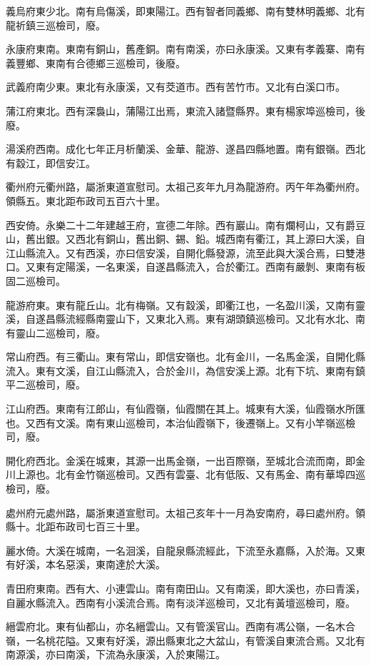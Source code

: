 義烏府東少北。南有烏傷溪，即東陽江。西有智者同義鄉、南有雙林明義鄉、北有龍祈鎮三巡檢司，廢。

永康府東南。東南有銅山，舊產銅。南有南溪，亦曰永康溪。又東有孝義寨、南有義豐鄉、東南有合德鄉三巡檢司，後廢。

武義府南少東。東北有永康溪，又有茭道市。西有苦竹市。又北有白溪口市。

蒲江府東北。西有深裊山，蒲陽江出焉，東流入諸暨縣界。東有楊家埠巡檢司，後廢。

湯溪府西南。成化七年正月析蘭溪、金華、龍游、遂昌四縣地置。南有銀嶺。西北有縠江，即信安江。

衢州府元衢州路，屬浙東道宣慰司。太祖己亥年九月為龍游府。丙午年為衢州府。領縣五。東北距布政司五百六十里。

西安倚。永樂二十二年建越王府，宣德二年除。西有巖山。南有爛柯山，又有爵豆山，舊出銀。又西北有銅山，舊出銅、錫、鉛。城西南有衢江，其上源曰大溪，自江山縣流入。又有西溪，亦曰信安溪，自開化縣發源，流至此與大溪合焉，曰雙港口。又東有定陽溪，一名東溪，自遂昌縣流入，合於衢江。西南有嚴剝、東南有板固二巡檢司。

龍游府東。東有龍丘山。北有梅嶺。又有縠溪，即衢江也，一名盈川溪，又南有靈溪，自遂昌縣流經縣南靈山下，又東北入焉。東有湖頭鎮巡檢司。又北有水北、南有靈山二巡檢司，廢。

常山府西。有三衢山。東有常山，即信安嶺也。北有金川，一名馬金溪，自開化縣流入。東有文溪，自江山縣流入，合於金川，為信安溪上源。北有下坑、東南有鎮平二巡檢司，廢。

江山府西。東南有江郎山，有仙霞嶺，仙霞關在其上。城東有大溪，仙霞嶺水所匯也。又西有文溪。南有東山巡檢司，本治仙霞嶺下，後遷嶺上。又有小竿嶺巡檢司，廢。

開化府西北。金溪在城東，其源一出馬金嶺，一出百際嶺，至城北合流而南，即金川上源也。北有金竹嶺巡檢司。又西有雲臺、北有低阪、又有馬金、南有華埠四巡檢司，廢。

處州府元處州路，屬浙東道宣慰司。太祖己亥年十一月為安南府，尋曰處州府。領縣十。北距布政司七百三十里。

麗水倚。大溪在城南，一名洄溪，自龍泉縣流經此，下流至永嘉縣，入於海。又東有好溪，本名惡溪，東南達於大溪。

青田府東南。西有大、小連雲山。南有南田山。又有南溪，即大溪也，亦曰青溪，自麗水縣流入。西南有小溪流合焉。南有淡洋巡檢司，又北有黃壇巡檢司，廢。

縉雲府北。東有仙都山，亦名縉雲山。又有管溪官山。西南有馮公嶺，一名木合嶺，一名桃花隘。又東有好溪，源出縣東北之大盆山，有管溪自東流合焉。又北有南源溪，亦曰南溪，下流為永康溪，入於東陽江。

